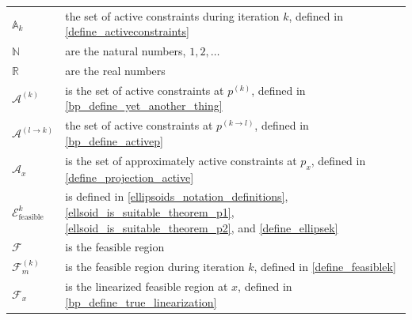 \documentclass{article}
\theoremstyle{case}
\numberwithin{theorem}{subsection}
\newcommand{\activeconstraintsk}{{\mathbb A_{k}}}
\newcommand{\feasiblek}{{\mathcal F_m^{(k)}}}
\newcommand{\feasible}{{\mathcal F}}
\newcommand{\naturals}{\mathbb N}
\newcommand{\reals}{\mathbb R}
\newcommand{\unshiftedellipsoid}{{\mathcal E^k_{\textrm{feasible}}}}
\begin{document}
\begin{longtable}{| p{} | p{} |}
$\activeconstraintsk$ & the set of active constraints during iteration $k$, defined in \cref{define_activeconstraints} \\ %
$\naturals $ & are the natural numbers, $1, 2, \ldots$ \\ %
$\reals $ & are the real numbers \\ %
$\mathcal A^{(k)}$ & is the set of active constraints at $p^{(k)}$, defined in \cref{bp_define_yet_another_thing} \\ %
$\mathcal A^{(l \to k)}$ & the set of active constraints at $p^{(k \to l)}$, defined in \cref{bp_define_activep} \\ %
$\mathcal A_x$ & is the set of approximately active constraints at $p_x$, defined in \cref{define_projection_active} \\ %
$\unshiftedellipsoid$ & is defined in \cref{ellipsoids_notation_definitions}, \cref{ellsoid_is_suitable_theorem_p1}, \cref{ellsoid_is_suitable_theorem_p2}, and \cref{define_ellipsek} \\ %
$\feasible$ & is the feasible region \\ %
$\feasiblek$ & is the feasible region during iteration $k$, defined in \cref{define_feasiblek} \\ %
$\mathcal F_x$ & is the linearized feasible region at $x$, defined in \cref{bp_define_true_linearization} \\ %

\end{longtable}
\end{document}
